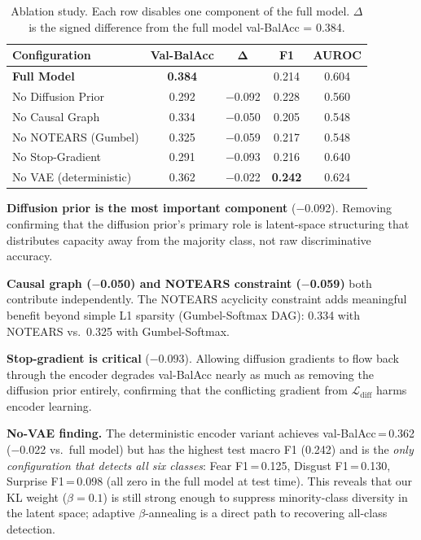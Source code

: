 \documentclass[conference]{IEEEtran}
\begin{document}
\begin{table}[htbp]
\caption{Ablation study.  Each row disables one component of the full model.
$\Delta$ is the signed difference from the full model val-BalAcc = 0.384.}
\label{tab:ablation}
\begin{center}
\setlength{\tabcolsep}{4pt}
\begin{tabular}{@{}lcccc@{}}
\toprule
\textbf{Configuration} & \textbf{Val-BalAcc} & $\boldsymbol{\Delta}$ & \textbf{F1} & \textbf{AUROC} \\
\midrule
\textbf{Full Model}      & \textbf{0.384} &      & 0.214 & 0.604 \\
\midrule
No Diffusion Prior       & 0.292 & $-$0.092 & 0.228 & 0.560 \\
No Causal Graph          & 0.334 & $-$0.050 & 0.205 & 0.548 \\
No NOTEARS (Gumbel)      & 0.325 & $-$0.059 & 0.217 & 0.548 \\
No Stop-Gradient         & 0.291 & $-$0.093 & 0.216 & 0.640 \\
No VAE (deterministic)   & 0.362 & $-$0.022 & \textbf{0.242} & 0.624 \\
\bottomrule
\end{tabular}
\end{center}
\end{table}

\textbf{Diffusion prior is the most important component} ($-$0.092).  Removing
confirming that the diffusion prior's primary role is latent-space structuring
that distributes capacity away from the majority class, not raw discriminative
accuracy.

\textbf{Causal graph ($-$0.050) and NOTEARS constraint ($-$0.059)} both
contribute independently.  The NOTEARS acyclicity constraint adds meaningful
benefit beyond simple L1 sparsity (Gumbel-Softmax DAG): 0.334 with NOTEARS
vs.\ 0.325 with Gumbel-Softmax.

\textbf{Stop-gradient is critical} ($-$0.093).  Allowing diffusion gradients
to flow back through the encoder degrades val-BalAcc nearly as much as removing
the diffusion prior entirely, confirming that the conflicting gradient from
$\mathcal{L}_{\mathrm{diff}}$ harms encoder learning.

\textbf{No-VAE finding.}  The deterministic encoder variant achieves
val-BalAcc\,=\,0.362 ($-$0.022 vs.\ full model) but has the highest test macro
F1 (0.242) and is the \emph{only configuration that detects all six classes}:
Fear F1\,=\,0.125, Disgust F1\,=\,0.130, Surprise F1\,=\,0.098 (all zero in
the full model at test time).  This reveals that our KL weight ($\beta=0.1$)
is still strong enough to suppress minority-class diversity in the latent space;
adaptive $\beta$-annealing is a direct path to recovering all-class detection.
\end{document}
